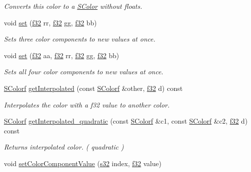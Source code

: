 \begin{DoxyCompactItemize}
\begin{DoxyCompactList}\small\item\em Converts this color to a \hyperlink{classirr_1_1video_1_1SColor}{S\+Color} without floats. \end{DoxyCompactList}\item 
void \hyperlink{classirr_1_1video_1_1SColorf_a99fe5c7d261d288d9afe301d4b90d41c}{set} (\hyperlink{namespaceirr_a0277be98d67dc26ff93b1a6a1d086b07}{f32} rr, \hyperlink{namespaceirr_a0277be98d67dc26ff93b1a6a1d086b07}{f32} gg, \hyperlink{namespaceirr_a0277be98d67dc26ff93b1a6a1d086b07}{f32} bb)
\begin{DoxyCompactList}\small\item\em Sets three color components to new values at once. \end{DoxyCompactList}\item 
void \hyperlink{classirr_1_1video_1_1SColorf_ae5a082e95ff2631651356f8a6daa2e73}{set} (\hyperlink{namespaceirr_a0277be98d67dc26ff93b1a6a1d086b07}{f32} aa, \hyperlink{namespaceirr_a0277be98d67dc26ff93b1a6a1d086b07}{f32} rr, \hyperlink{namespaceirr_a0277be98d67dc26ff93b1a6a1d086b07}{f32} gg, \hyperlink{namespaceirr_a0277be98d67dc26ff93b1a6a1d086b07}{f32} bb)
\begin{DoxyCompactList}\small\item\em Sets all four color components to new values at once. \end{DoxyCompactList}\item 
\hyperlink{classirr_1_1video_1_1SColorf}{S\+Colorf} \hyperlink{classirr_1_1video_1_1SColorf_a7167069deeacd120985dedfc578e98f3}{get\+Interpolated} (const \hyperlink{classirr_1_1video_1_1SColorf}{S\+Colorf} \&other, \hyperlink{namespaceirr_a0277be98d67dc26ff93b1a6a1d086b07}{f32} d) const 
\begin{DoxyCompactList}\small\item\em Interpolates the color with a f32 value to another color. \end{DoxyCompactList}\item 
\hyperlink{classirr_1_1video_1_1SColorf}{S\+Colorf} \hyperlink{classirr_1_1video_1_1SColorf_aaba8f592ab29c706a57ef4fdeccf362a}{get\+Interpolated\+\_\+quadratic} (const \hyperlink{classirr_1_1video_1_1SColorf}{S\+Colorf} \&c1, const \hyperlink{classirr_1_1video_1_1SColorf}{S\+Colorf} \&c2, \hyperlink{namespaceirr_a0277be98d67dc26ff93b1a6a1d086b07}{f32} d) const 
\begin{DoxyCompactList}\small\item\em Returns interpolated color. ( quadratic ) \end{DoxyCompactList}\item 
void \hyperlink{classirr_1_1video_1_1SColorf_a79c420ed7052d68d3827f455881535af}{set\+Color\+Component\+Value} (\hyperlink{namespaceirr_ac66849b7a6ed16e30ebede579f9b47c6}{s32} index, \hyperlink{namespaceirr_a0277be98d67dc26ff93b1a6a1d086b07}{f32} value)\hypertarget{classirr_1_1video_1_1SColorf_a79c420ed7052d68d3827f455881535af}{}\label{classirr_1_1video_1_1SColorf_a79c420ed7052d68d3827f455881535af}


\end{DoxyCompactItemize}
